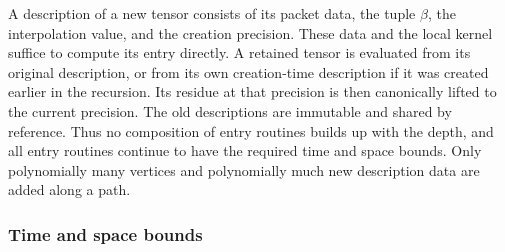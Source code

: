 A description of a new tensor consists of its packet data, the
tuple $\beta$, the interpolation value, and the creation precision.
These data and the local kernel suffice to compute its entry directly.  A retained tensor
is evaluated from its original description, or from its own
creation-time description if it was created earlier in the
recursion.  Its residue at that precision is then canonically
lifted to the current precision.  The old descriptions are
immutable and shared by reference.  Thus no composition of
entry routines builds up with the depth, and all entry routines
continue to have the required time and space bounds.
Only polynomially many vertices and polynomially much new
description data are added along a path.

\subsubsection{Time and space bounds}
\label{subsec:tensor-cost}

